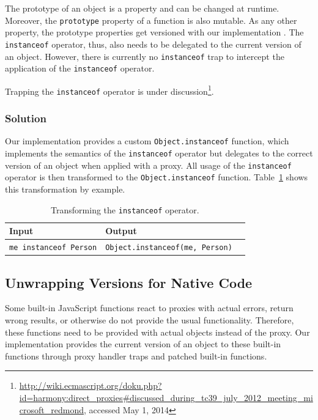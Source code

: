 The prototype of an object is a property and can be changed at runtime.
Moreover, the \lstinline{prototype} property of a function is also mutable.
As any other property, the prototype properties get versioned with our implementation .
The \lstinline{instanceof} operator, thus, also needs to be delegated to the current version of an object.
However, there is currently no \lstinline{instanceof} trap to intercept the application of the \lstinline{instanceof} operator.

Trapping the \lstinline{instanceof} operator is under discussion\footnote{\url{http://wiki.ecmascript.org/doku.php?id=harmony:direct_proxies\#discussed_during_tc39_july_2012_meeting_microsoft_redmond}, accessed May 1, 2014}.


\subsubsection{Solution}

Our implementation provides a custom \lstinline{Object.instanceof} function, which implements the semantics of the \lstinline{instanceof} operator but delegates to the correct version of an object when applied with a proxy.
All usage of the \lstinline{instanceof} operator is then transformed to the \lstinline{Object.instanceof} function.
Table~\ref{table:transformingInstanceof} shows this transformation by example.

\begin{table}[h]
\begin{center}
\begin{tabular}{| l | l | l |}
\hline
Input & Output \\ \hline
\lstinline|me instanceof Person| & \lstinline|Object.instanceof(me, Person)| \\ \hline
\end{tabular}
\end{center}
\caption[Table caption text]{Transforming the \lstinline{instanceof} operator.}
\label{table:transformingInstanceof}
\end{table}



\subsection{Unwrapping Versions for Native Code} \label{subsec:IMPLEMENTATION:4.3}

Some built-in JavaScript functions react to proxies with actual errors, return wrong results, or otherwise do not provide the usual functionality.
Therefore, these functions need to be provided with actual objects instead of the proxy.
Our implementation provides the current version of an object to these built-in functions through proxy handler traps and patched built-in functions.

